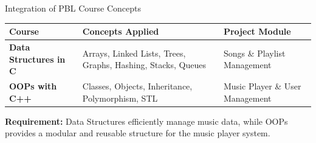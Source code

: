 \documentclass[aspectratio=169,11pt]{beamer}
\begin{document}
\begin{frame}{Integration of PBL Course Concepts}

\scriptsize
\begin{center}
\renewcommand{\arraystretch}{1.35}

\begin{tabularx}{.96\textwidth}
{@{}>{\bfseries}p{3.2cm}X p{3.0cm}@{}}
\toprule
Course & Concepts Applied & Project Module\\
\midrule
Data Structures in C &
Arrays, Linked Lists, Trees, Graphs, Hashing, Stacks, Queues &
Songs \& Playlist Management\\

OOPs with C++ &
Classes, Objects, Inheritance, Polymorphism, STL &
Music Player \& User Management\\
\bottomrule
\end{tabularx}
\end{center}

\vfill

\begin{center}
\colorbox{GEULightBlue}{%
\parbox{.86\textwidth}{\centering
\textbf{Requirement:}
Data Structures efficiently manage music data, while OOPs provides
a modular and reusable structure for the music player system.}}
\end{center}

\end{frame}
\end{document}
